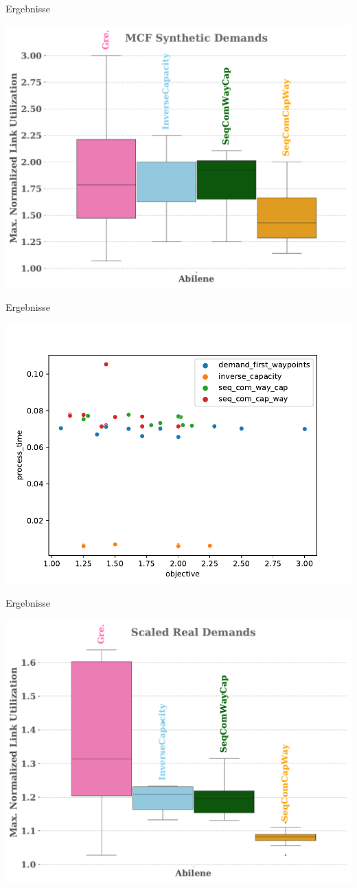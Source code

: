 \documentclass[aspectratio=169,10pt]{beamer}
\begin{document}
\begin{frame}{Ergebnisse}
\begin{center}
\includegraphics[width=.8\textwidth]{images/pouria_all_algorithms_abilene.pdf}
\end{center}
\end{frame}
\begin{frame}{Ergebnisse}
\begin{center}
\includegraphics[width=.8\textwidth]{images/pouria_colored_scatter_plot_results_all_algorithms.pdf}
\end{center}
\end{frame}
\begin{frame}{Ergebnisse}
\begin{center}
\includegraphics[width=.8\textwidth]{images/pouria_real_demands.pdf}
\end{center}
\end{frame}
\end{document}
